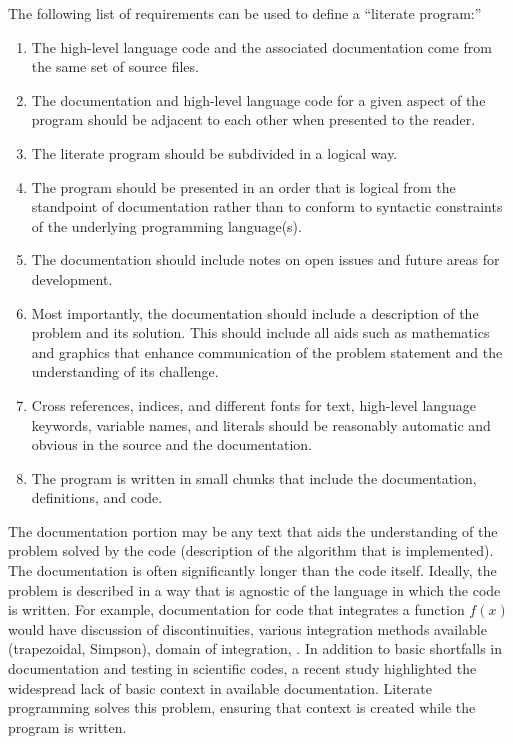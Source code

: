 \label{literate-program-requirements}
The following list of requirements can be used to define a ``literate program:''\cite{childs}
\begin{enumerate}
\item The high-level language code and the associated documentation come from the same 
set of source files.
\item The documentation and high-level language code for a given aspect of the program should be 
adjacent to each other when presented to the reader.
\item The literate program should be subdivided in a logical way.
\item The program should be presented in an order that is logical from the standpoint of documentation
rather than to conform to syntactic constraints of the underlying programming language(s).
\item The documentation should include notes on open issues and future areas for development.
\item Most importantly, the documentation should include a description of the problem and its solution. 
This should include all aids such as mathematics and graphics that enhance communication of the problem 
statement and the understanding of its challenge.
\item Cross references, indices, and different fonts for text, high-level language keywords, 
variable names, and literals should be reasonably automatic and obvious in the source and the documentation.
\item The program is written in small chunks that include the documentation, definitions, and code.
\end{enumerate}

The documentation portion may be any text that aids the understanding of the problem solved by the code 
(\eg description of the algorithm that is implemented).  The documentation is often significantly 
longer than the code itself. Ideally, the problem is described in a way that is agnostic of the language
in which the code is written.  For example, documentation for code that integrates a function $f(x)$ would
have discussion of discontinuities, various integration methods available (\eg trapezoidal, Simpson), 
domain of integration, \etc. 
In addition to basic shortfalls in documentation and testing in scientific codes, a recent 
study highlighted the widespread lack of basic context in available documentation.\cite{petre}
Literate programming solves this problem, ensuring that context is created while the program
is written.

